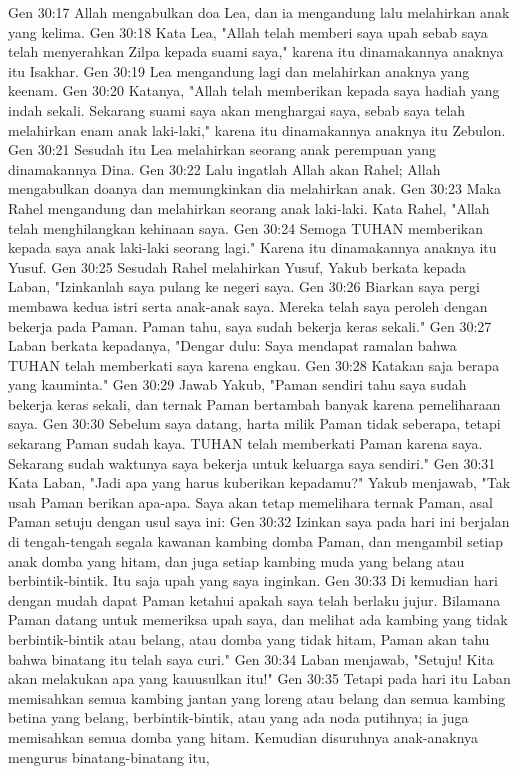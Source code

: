 Gen 30:17  Allah mengabulkan doa Lea, dan ia mengandung lalu melahirkan anak yang kelima.
Gen 30:18  Kata Lea, "Allah telah memberi saya upah sebab saya telah menyerahkan Zilpa kepada suami saya," karena itu dinamakannya anaknya itu Isakhar.
Gen 30:19  Lea mengandung lagi dan melahirkan anaknya yang keenam.
Gen 30:20  Katanya, "Allah telah memberikan kepada saya hadiah yang indah sekali. Sekarang suami saya akan menghargai saya, sebab saya telah melahirkan enam anak laki-laki," karena itu dinamakannya anaknya itu Zebulon.
Gen 30:21  Sesudah itu Lea melahirkan seorang anak perempuan yang dinamakannya Dina.
Gen 30:22  Lalu ingatlah Allah akan Rahel; Allah mengabulkan doanya dan memungkinkan dia melahirkan anak.
Gen 30:23  Maka Rahel mengandung dan melahirkan seorang anak laki-laki. Kata Rahel, "Allah telah menghilangkan kehinaan saya.
Gen 30:24  Semoga TUHAN memberikan kepada saya anak laki-laki seorang lagi." Karena itu dinamakannya anaknya itu Yusuf.
Gen 30:25  Sesudah Rahel melahirkan Yusuf, Yakub berkata kepada Laban, "Izinkanlah saya pulang ke negeri saya.
Gen 30:26  Biarkan saya pergi membawa kedua istri serta anak-anak saya. Mereka telah saya peroleh dengan bekerja pada Paman. Paman tahu, saya sudah bekerja keras sekali."
Gen 30:27  Laban berkata kepadanya, "Dengar dulu: Saya mendapat ramalan bahwa TUHAN telah memberkati saya karena engkau.
Gen 30:28  Katakan saja berapa yang kauminta."
Gen 30:29  Jawab Yakub, "Paman sendiri tahu saya sudah bekerja keras sekali, dan ternak Paman bertambah banyak karena pemeliharaan saya.
Gen 30:30  Sebelum saya datang, harta milik Paman tidak seberapa, tetapi sekarang Paman sudah kaya. TUHAN telah memberkati Paman karena saya. Sekarang sudah waktunya saya bekerja untuk keluarga saya sendiri."
Gen 30:31  Kata Laban, "Jadi apa yang harus kuberikan kepadamu?" Yakub menjawab, "Tak usah Paman berikan apa-apa. Saya akan tetap memelihara ternak Paman, asal Paman setuju dengan usul saya ini:
Gen 30:32  Izinkan saya pada hari ini berjalan di tengah-tengah segala kawanan kambing domba Paman, dan mengambil setiap anak domba yang hitam, dan juga setiap kambing muda yang belang atau berbintik-bintik. Itu saja upah yang saya inginkan.
Gen 30:33  Di kemudian hari dengan mudah dapat Paman ketahui apakah saya telah berlaku jujur. Bilamana Paman datang untuk memeriksa upah saya, dan melihat ada kambing yang tidak berbintik-bintik atau belang, atau domba yang tidak hitam, Paman akan tahu bahwa binatang itu telah saya curi."
Gen 30:34  Laban menjawab, "Setuju! Kita akan melakukan apa yang kauusulkan itu!"
Gen 30:35  Tetapi pada hari itu Laban memisahkan semua kambing jantan yang loreng atau belang dan semua kambing betina yang belang, berbintik-bintik, atau yang ada noda putihnya; ia juga memisahkan semua domba yang hitam. Kemudian disuruhnya anak-anaknya mengurus binatang-binatang itu,

